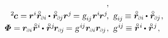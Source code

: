 \begin{equation*}
\begin{array}{r@{\hspace{.5em}}l}
\hspace{-0.3ex} ,
\\[.25em]
%
{{^2}\hspace{-0.2ex}\bm{c}} = \hspace{-0.1ex} \currentlocationvector^{i} \initiallocationvector_\differentialindex{i} \hspace{-0.1ex} \dotp \hspace{.1ex} \initiallocationvector_\differentialindex{\hspace{-0.1ex}j} \currentlocationvector^{j} \hspace{-0.25ex}
= \textsl{g}_{i\hspace{-0.1ex}j} \hspace{.1ex} \currentlocationvector^{i} \hspace{-0.2ex} \currentlocationvector^{j}
\hspace{-0.3ex} , &
\textsl{g}_{i\hspace{-0.1ex}j} \hspace{-0.15ex} \equiv
\initiallocationvector_\differentialindex{i} \hspace{-0.1ex} \dotp \hspace{.1ex} \initiallocationvector_\differentialindex{\hspace{-0.1ex}j}
\hspace{.1ex} ,
\\[.25em]
%
\mathboldPhi = \hspace{-0.1ex} \currentlocationvector_\differentialindex{i} \hspace{.1ex} \initiallocationvector^i \hspace{-0.15ex} \dotp \hspace{.1ex} \initiallocationvector^j \hspace{-0.25ex} \currentlocationvector_\differentialindex{\hspace{-0.1ex}j} \hspace{-0.2ex}
= \textsl{g}^{\hspace{.2ex}i\hspace{-0.1ex}j} \currentlocationvector_\differentialindex{i} \currentlocationvector_\differentialindex{\hspace{-0.1ex}j}
\hspace{.1ex} , &
\textsl{g}^{\hspace{.2ex}i\hspace{-0.1ex}j} \hspace{-0.15ex} \equiv
\initiallocationvector^{\hspace{.1ex}i} \hspace{-0.15ex} \dotp \hspace{.1ex} \initiallocationvector^{\hspace{.1ex}j}
\hspace{.1ex} ,
\end{array}
\end{equation*}

